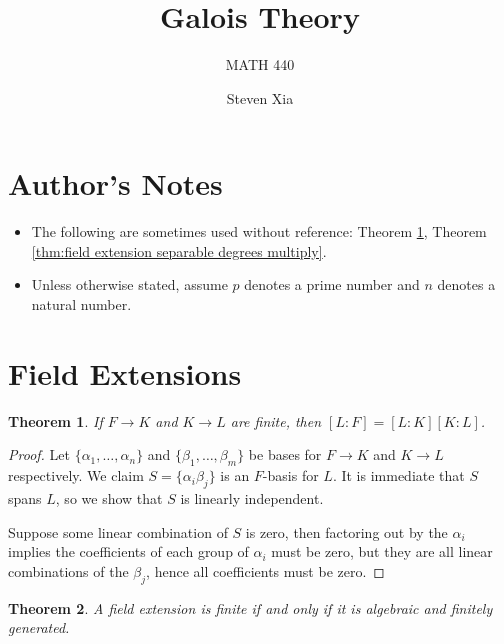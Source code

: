 \documentclass[
    parskip=half,
    toc=flat,
    toc=sectionentrydotfill,
]{scrartcl}  %
\title{Galois Theory}
\subtitle{MATH 440}
\author{Steven Xia}
\theoremstyle{definition}
\theoremstyle{plain}
\newtheorem{theorem}{Theorem}[section]
\theoremstyle{remark}
\begin{document}
\maketitle

\begin{quote} 
\end{quote}

\tableofcontents


\section{Author's Notes}

\begin{itemize}[leftmargin=*]
    \item
        The following are sometimes used without reference:
        Theorem \ref{thm:field extension degrees multiply},
        Theorem \ref{thm:field extension separable degrees multiply}.

    \item Unless otherwise stated, assume $p$ denotes a prime number and $n$ denotes a natural number.
\end{itemize}


\section{Field Extensions}

\begin{theorem}
    \label{thm:field extension degrees multiply}
    If $F\to K$ and $K\to L$ are finite, then $[L:F]=[L:K][K:L]$.
\end{theorem}

\begin{proof}
    Let $\{\alpha_1,\dots,\alpha_n\}$ and $\{\beta_1,\dots,\beta_m\}$ be bases for $F\to K$ and $K\to L$
    respectively.
    We claim $S=\{\alpha_i\beta_j\}$ is an $F$-basis for $L$.
    It is immediate that $S$ spans $L$, so we show that $S$ is linearly independent.

    Suppose some linear combination of $S$ is zero, then factoring out by the $\alpha_i$ implies the coefficients of
    each group of $\alpha_i$ must be zero, but they are all linear combinations of the $\beta_j$, hence all
    coefficients must be zero.
\end{proof}

\begin{theorem}
    \label{thm:finite iff algebraic and finitely generated}
    A field extension is finite if and only if it is algebraic and finitely generated.
\end{theorem}
\end{document}
